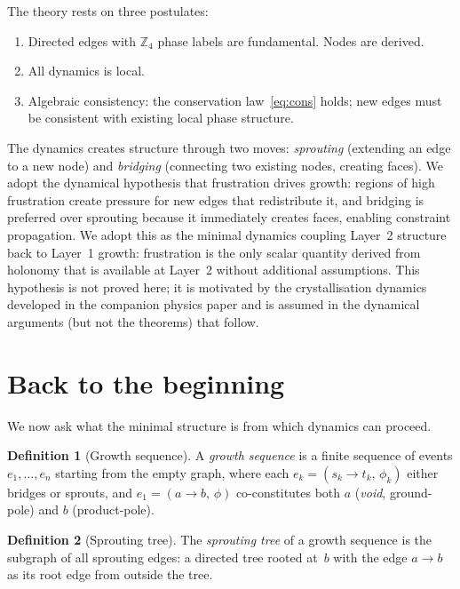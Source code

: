 \documentclass[11pt,a4paper]{article}
\theoremstyle{definition}
\newtheorem{definition}{Definition}[section]
\theoremstyle{plain}
\theoremstyle{remark}
\newcommand{\Zf}{\mathbb{Z}_4}
\begin{document}
The theory rests on three postulates:
\begin{enumerate}[nosep]
  \item Directed edges with $\Zf$ phase labels are fundamental.  Nodes are derived.
  \item All dynamics is local.
  \item Algebraic consistency: the conservation law~\eqref{eq:cons} holds; new edges must be consistent with existing local phase structure.
\end{enumerate}

The dynamics creates structure through two moves: \emph{sprouting} (extending an edge to a new node) and \emph{bridging} (connecting two existing nodes, creating faces).  We adopt the dynamical hypothesis that frustration drives growth: regions of high frustration create pressure for new edges that redistribute it, and bridging is preferred over sprouting because it immediately creates faces, enabling constraint propagation.  We adopt this as the minimal dynamics coupling Layer~2 structure back to Layer~1 growth: frustration is the only scalar quantity derived from holonomy that is available at Layer~2 without additional assumptions.  This hypothesis is not proved here; it is motivated by the crystallisation dynamics developed in the companion physics paper and is assumed in the dynamical arguments (but not the theorems) that follow.

\section{Back to the beginning}\label{sec:bootstrap}

We now ask what the minimal structure is from which dynamics can proceed.

\begin{definition}[Growth sequence]\label{def:bootstrap}
  A \emph{growth sequence} is a finite sequence of events $e_1, \ldots, e_n$ starting from the empty graph, where each $e_k = (s_k \to t_k,\, \phi_k)$ either bridges or sprouts, and $e_1 = (a \to b,\, \phi)$ co-constitutes both $a$ (\emph{void}, ground-pole) and $b$ (product-pole).
\end{definition}

\begin{definition}[Sprouting tree]\label{def:tree}
  The \emph{sprouting tree} of a growth sequence is the subgraph of all sprouting edges: a directed tree rooted at~$b$ with the edge $a \to b$ as its root edge from outside the tree.
\end{definition}
\end{document}
